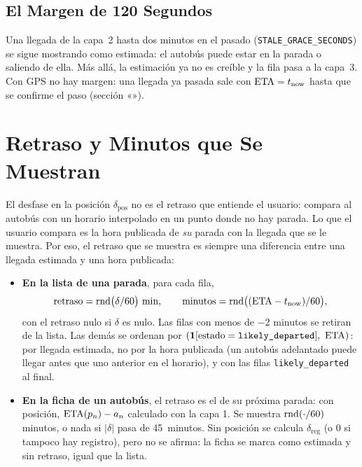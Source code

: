 \subsection{El Margen de 120 Segundos} Una llegada de la capa~2 hasta dos minutos en el pasado
(\texttt{STALE\_GRACE\_SECONDS}) se sigue mostrando como estimada: el autobús puede estar en la parada o saliendo de
ella. Más allá, la estimación ya no es creíble y la fila pasa a la capa~3. Con GPS no hay margen: una llegada ya
pasada sale con $\mathrm{ETA}=t_{\mathrm{now}}$ hasta que se confirme el paso (sección «»).

\section{Retraso y Minutos que Se Muestran}
\label{sec:retraso-mostrado}

El desfase en la posición $\delta_{\mathrm{pos}}$ no es el retraso que entiende el usuario: compara al autobús con un
horario interpolado en un punto donde no hay parada. Lo que el usuario compara es la hora publicada de \emph{su} parada
con la llegada que se le muestra. Por eso, el retraso que se muestra es siempre una diferencia entre una llegada
estimada y una hora publicada:

\begin{itemize}
  \item \textbf{En la lista de una parada}, para cada fila,
        \begin{equation}
        \label{eq:retraso-lista}
        \text{retraso}=\operatorname{rnd}\!\big(\delta/60\big)\ \text{min},\qquad \text{minutos}=\operatorname{rnd}\!\big((\mathrm{ETA}-t_{\mathrm{now}})/60\big),
        \end{equation}
        con el retraso nulo si $\delta$ es nulo. Las filas con menos de $-2$ minutos se retiran de la lista. Las demás
        se ordenan por $(\mathbf{1}[\text{estado}=\texttt{likely\_departed}],\ \ETA)$: por llegada estimada, no por la
        hora publicada (un autobús adelantado puede llegar antes que uno anterior en el horario), y con las filas
        \texttt{likely\_departed} al final.
  \item \textbf{En la ficha de un autobús}, el retraso es el de su próxima parada: con posición, $\mathrm{ETA}(p_n)-a_n$
        calculado con la capa 1. Se muestra $\operatorname{rnd}(\cdot/60)$ minutos, o nada si $|\delta|$ pasa de 45~minutos. Sin
        posición se calcula $\delta_{\mathrm{reg}}$ (o 0 si tampoco hay registro), pero no se afirma: la ficha se marca
        como estimada y sin retraso, igual que la lista.
\end{itemize}

